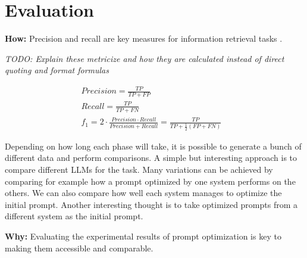 \section{Evaluation}
\textbf{How:} Precision and recall are key measures for information retrieval tasks \cite{hayes2006AdvancingCandidate}. 

\textit{TODO: Explain these metricize and how they are calculated instead of direct quoting and format formulas} 

\begin{align*} 
    Precision = \frac{TP}{TP + FP} &\\
    Recall = \frac{TP}{TP + FN} &\\
    f_1 = 2 \cdot \frac{Precision \cdot Recall}{Precision + Recall} = \frac{TP}{TP + \frac{1}{2}(FP + FN)} &
\end{align*}



Depending on how long each phase will take, it is possible to generate a bunch of different data and perform comparisons.
A simple but interesting approach is to compare different LLMs for the task. Many variations can be achieved by comparing for example how a prompt optimized by one system performs on the others. We can also compare how well each system manages to optimize the initial prompt. 
Another interesting thought is to take optimized prompts from a different system as the initial prompt. 


\textbf{Why:} Evaluating the experimental results of prompt optimization is key to making them accessible and comparable. 